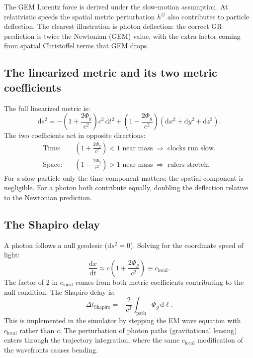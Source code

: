 \documentclass[11pt,a4paper]{article}
\newcommand{\Phig}{\Phi_g}
\newcommand{\dd}{\mathrm{d}}
\begin{document}
The GEM Lorentz force is derived under the slow-motion assumption.  At relativistic speeds the spatial metric perturbation $h^{ij}$ also contributes to particle deflection.  The clearest illustration is photon deflection: the correct GR prediction is twice the Newtonian (GEM) value, with the extra factor coming from spatial Christoffel terms that GEM drops.

\subsection{The linearized metric and its two metric coefficients}

The full linearized metric is:
\begin{equation}
  \dd s^2 = -\!\left(1+\frac{2\Phig}{c^2}\right)c^2\,\dd t^2
            + \left(1-\frac{2\Phig}{c^2}\right)\!\left(\dd x^2+\dd y^2+\dd z^2\right).
\end{equation}
The two coefficients act in opposite directions:
\begin{align}
  \text{Time:}  &\quad \left(1+\frac{2\Phig}{c^2}\right) < 1 \text{ near mass} \;\Rightarrow\; \text{clocks run slow.} \\
  \text{Space:} &\quad \left(1-\frac{2\Phig}{c^2}\right) > 1 \text{ near mass} \;\Rightarrow\; \text{rulers stretch.}
\end{align}
For a slow particle only the time component matters; the spatial component is negligible.  For a photon both contribute equally, doubling the deflection relative to the Newtonian prediction.

\subsection{The Shapiro delay}

A photon follows a null geodesic ($\dd s^2=0$).  Solving for the coordinate speed of light:
\begin{equation}
  \frac{\dd x}{\dd t} \approx c\!\left(1 + \frac{2\Phig}{c^2}\right) \equiv c_{\mathrm{local}}.
\end{equation}
The factor of 2 in $c_{\mathrm{local}}$ comes from both metric coefficients contributing to the null condition.  The Shapiro delay is:
\begin{equation}
  \Delta t_{\mathrm{Shapiro}} = -\frac{2}{c^3}\int_{\mathrm{path}}\Phig\,\dd\ell.
\end{equation}
This is implemented in the simulator by stepping the EM wave equation with $c_{\mathrm{local}}$ rather than $c$.  The perturbation of photon paths (gravitational lensing) enters through the trajectory integration, where the same $c_{\mathrm{local}}$ modification of the wavefronts causes bending.
\end{document}
